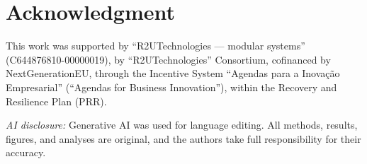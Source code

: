 \documentclass[conference,a4paper]{IEEEtran}
\begin{document}
\section*{Acknowledgment}
This work was supported by ``R2UTechnologies --- modular systems'' (C644876810-00000019), by ``R2UTechnologies'' Consortium, cofinanced by NextGenerationEU, through the Incentive System ``Agendas para a Inova\c{c}\~ao Empresarial'' (``Agendas for Business Innovation''), within the Recovery and Resilience Plan (PRR).

\textit{AI disclosure:} Generative AI was used for language editing. All methods, results, figures, and analyses are original, and the authors take full responsibility for their accuracy.

\begingroup\renewcommand{\footnotesize}{\scriptsize}\endgroup
\end{document}
